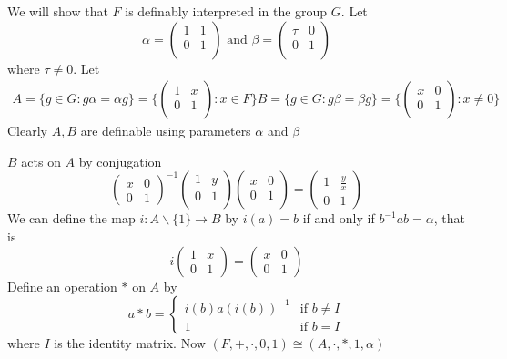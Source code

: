 \documentclass[11pt]{article}
\begin{document}
We will show that \(F\) is definably interpreted in the group \(G\). Let
\begin{equation*}
 \alpha=\begin{pmatrix}
        1&1\\
        0&1\\
        \end{pmatrix}\text{ and }
\beta=\begin{pmatrix}
\tau&0\\
0&1\\
      \end{pmatrix}
\end{equation*}
where \(\tau\neq 0\). Let
\begin{gather*}
A=\{g\in G:g\alpha=\alpha g\}=\{\begin{pmatrix}
1&x\\
0&1\\
                                \end{pmatrix}:x\in F\}
B=\{g\in G:g\beta=\beta g\}=\{\begin{pmatrix}
x&0\\
0&1\\
                                \end{pmatrix}:x\neq 0\}
\end{gather*}
Clearly \(A,B\) are definable using parameters \(\alpha\) and \(\beta\)

\(B\) acts on \(A\) by conjugation
\begin{equation*}
\begin{pmatrix}
x&0\\
0&1
\end{pmatrix}^{-1}
\begin{pmatrix}
1&y\\
0&1\\
\end{pmatrix}
\begin{pmatrix}
x&0\\
0&1\\
\end{pmatrix}=
\begin{pmatrix}
1&\frac{y}{x}\\
0&1
\end{pmatrix}
\end{equation*}
We can define the map \(i:A\backslash\{1\}\to B\) by \(i(a)=b\) if and only if
\(b^{-1}ab=\alpha\), that is
\begin{equation*}
i \begin{pmatrix}
1&x\\
0&1
  \end{pmatrix}=
\begin{pmatrix}
x&0\\
0&1
\end{pmatrix}
\end{equation*}
Define an operation \(*\) on \(A\) by
\begin{equation*}
a*b=
\begin{cases}
i(b)a(i(b))^{-1}&\text{if } b\neq I\\
1&\text{if } b=I
\end{cases}
\end{equation*}
where \(I\) is the identity matrix. Now \((F,+,\cdot,0,1)\cong (A,\cdot,*,1,\alpha)\)
\end{document}
